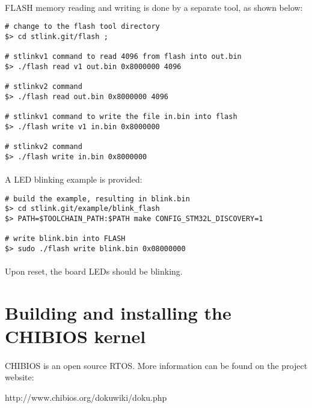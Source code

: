 \documentclass[a4paper, 11pt]{article}
\begin{document}
\paragraph{}
FLASH memory reading and writing is done by a separate tool, as shown below:\\
\begin{small}
\begin{lstlisting}[frame=tb]
# change to the flash tool directory
$> cd stlink.git/flash ;

# stlinkv1 command to read 4096 from flash into out.bin
$> ./flash read v1 out.bin 0x8000000 4096

# stlinkv2 command
$> ./flash read out.bin 0x8000000 4096

# stlinkv1 command to write the file in.bin into flash
$> ./flash write v1 in.bin 0x8000000

# stlinkv2 command
$> ./flash write in.bin 0x8000000
\end{lstlisting}
\end{small}

\paragraph{}
A LED blinking example is provided:\\
\begin{small}
\begin{lstlisting}[frame=tb]
# build the example, resulting in blink.bin
$> cd stlink.git/example/blink_flash
$> PATH=$TOOLCHAIN_PATH:$PATH make CONFIG_STM32L_DISCOVERY=1

# write blink.bin into FLASH
$> sudo ./flash write blink.bin 0x08000000
\end{lstlisting}
\end{small}

\paragraph{}
Upon reset, the board LEDs should be blinking.

\newpage
\section{Building and installing the CHIBIOS kernel}
\paragraph{}
CHIBIOS is an open source RTOS. More information can be found on the project website:
\begin{center}
http://www.chibios.org/dokuwiki/doku.php
\end{center}
\end{document}
